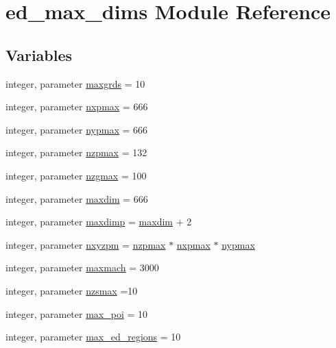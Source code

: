 \hypertarget{namespaceed__max__dims}{}\section{ed\+\_\+max\+\_\+dims Module Reference}
\label{namespaceed__max__dims}
\subsection*{Variables}
\begin{DoxyCompactItemize}
\item 
integer, parameter \hyperlink{namespaceed__max__dims_a76506f11ab040bb342f7eeeda2609717}{maxgrds} = 10
\item 
integer, parameter \hyperlink{namespaceed__max__dims_a916d08772a2cdff90b033432f7c043dd}{nxpmax} = 666
\item 
integer, parameter \hyperlink{namespaceed__max__dims_a70351cc508b47a5bfa506ba83bf41523}{nypmax} = 666
\item 
integer, parameter \hyperlink{namespaceed__max__dims_af7442061eb579be9e9fa573af2fae0d0}{nzpmax} = 132
\item 
integer, parameter \hyperlink{namespaceed__max__dims_ab4473c9ce607be530183213a2b990ba5}{nzgmax} = 100
\item 
integer, parameter \hyperlink{namespaceed__max__dims_a9939d6b90ae112d873f844ddf07a6544}{maxdim} = 666
\item 
integer, parameter \hyperlink{namespaceed__max__dims_a203a83a4c06e8a68f13e469a976083d4}{maxdimp} = \hyperlink{namespaceed__max__dims_a9939d6b90ae112d873f844ddf07a6544}{maxdim} + 2
\item 
integer, parameter \hyperlink{namespaceed__max__dims_a1a2dbf06e020c31e81f4f1b3537e7111}{nxyzpm} = \hyperlink{namespaceed__max__dims_af7442061eb579be9e9fa573af2fae0d0}{nzpmax} $\ast$ \hyperlink{namespaceed__max__dims_a916d08772a2cdff90b033432f7c043dd}{nxpmax} $\ast$ \hyperlink{namespaceed__max__dims_a70351cc508b47a5bfa506ba83bf41523}{nypmax}
\item 
integer, parameter \hyperlink{namespaceed__max__dims_a499b4b6352c44f2e900d47d4a1c96bb9}{maxmach} = 3000
\item 
integer, parameter \hyperlink{namespaceed__max__dims_a9ae5c1b79b953a335b3038d4fd3b206b}{nzsmax} =10
\item 
integer, parameter \hyperlink{namespaceed__max__dims_a4a66ae8729df41bb66a806d56f685ada}{max\+\_\+poi} = 10
\item 
integer, parameter \hyperlink{namespaceed__max__dims_a046576e3650edec35f14647030a0ad7e}{max\+\_\+ed\+\_\+regions} = 10

\end{DoxyCompactItemize}
